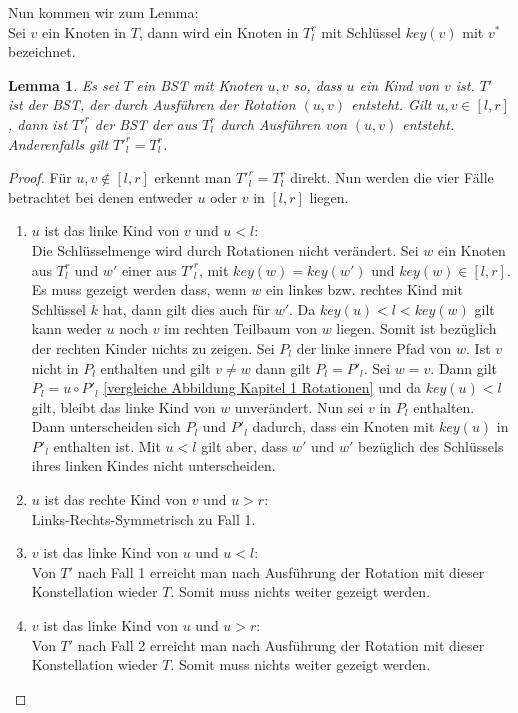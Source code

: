\documentclass[a4paper,12pt]{article}
\begin{document}
 \noindent Nun kommen wir zum Lemma:\\
 
 


	    
	 
 \noindent Sei $v$ ein Knoten in $T$, dann wird ein Knoten in $T^r_l$ mit Schlüssel $\mathit{key}(v)$  mit $v^*$ bezeichnet.  
\newtheorem{Lemma3}{Lemma}[section]
\begin{Lemma3} Es sei $T$ ein BST mit Knoten $u, v$ so, dass $u$ ein Kind von $v$ ist. $T'$ ist der BST, der durch Ausführen der Rotation $\left(u,v\right)$ entsteht. Gilt $u,v \in \left[l,r\right]$, dann ist ${T'}^r_l$ der BST der aus $T^r_l$ durch Ausführen von  $\left(u,v\right)$ entsteht. Anderenfalls gilt ${T'}^r_l = T^r_l$.
\end{Lemma3}
\begin{proof}
\noindent Für $u,v \notin \left[l,r\right]$ erkennt man $T'^r_l = T^r_l$ direkt.
Nun werden die vier Fälle betrachtet bei denen entweder $u$ oder $v$ in $\left[l,r\right]$ liegen.
\begin{enumerate}
	\item $u$ ist das linke Kind von $v$ und $u < l$:\\
	Die Schlüsselmenge wird durch Rotationen nicht verändert. Sei $w$ ein Knoten aus $T^r_l$ und $w'$ einer aus $T'^r_l$, mit $\mathit{key}(w) = \mathit{key}(w')$ und $\mathit{key}(w) \in \left[l,r\right]$. Es muss gezeigt werden dass, wenn $w$ ein linkes bzw. rechtes Kind mit Schlüssel $k$ hat, dann gilt dies auch für $w'$. Da $\mathit{key}(u) < l < \mathit{key}(w) $ gilt kann weder $u$ noch $v$ im rechten Teilbaum von $w$ liegen. Somit ist bezüglich der rechten Kinder nichts zu zeigen. 
	Sei $P_l$ der linke innere Pfad von $w$. Ist $v$ nicht in $P_l$ enthalten und gilt $v \neq w$ dann gilt $P_l = P'_l$. Sei $w = v$. Dann gilt $P_l = u  \circ  P'_l$ \ref{vergleiche Abbildung Kapitel 1 Rotationen} und da $\mathit{key}(u) < l$ gilt, bleibt das linke Kind von $w$ unverändert. Nun sei $v$ in $P_l$ enthalten. Dann unterscheiden sich  $P_l$ und  $P'_l$ dadurch, dass ein Knoten mit $\mathit{key}(u)$ in $P'_l$ enthalten ist. Mit $u < l$ gilt aber, dass $w'$ und $w'$ bezüglich des Schlüssels ihres linken Kindes nicht unterscheiden.
	\item $u$ ist das rechte Kind von $v$ und $u > r$:\\
	Links-Rechts-Symmetrisch zu Fall 1. 
	\item $v$ ist das linke Kind von $u$ und $u < l$:\\
	    Von $T'$ nach Fall 1 erreicht man nach Ausführung der Rotation mit dieser Konstellation wieder $T$. Somit muss nichts weiter gezeigt werden.
	\item $v$ ist das linke Kind von $u$ und $u > r$:\\
	Von $T'$ nach Fall 2 erreicht man nach Ausführung der Rotation mit dieser Konstellation wieder $T$. Somit muss nichts weiter gezeigt werden.\\
       	    

\end{enumerate}
\end{proof}
\end{document}
